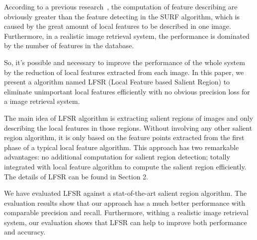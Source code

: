 According to a previous research~\cite{Fang2011ispass}, the computation of feature describing are obviously greater than the feature detecting in the SURF algorithm, which is caused by the great amount of local features to be described in one image. Furthermore, in a realistic image retrieval system, the performance is dominated by the number of features in the database.

So, it's possible and necessary to improve the performance of the whole system by the reduction of local features extracted from each image. In this paper, we present a algorithm named LFSR (Local Feature based Salient Region) to eliminate unimportant local features efficiently with no obvious precision loss for a image retrieval system.

The main idea of LFSR algorithm is extracting salient regions of images and only describing the local features in those regions. Without involving any other salient region algorithm, it is only based on the feature points extracted from the first phase of a typical local feature algorithm. This approach has two remarkable advantages: no additional computation for salient region detection; totally integrated with local feature algorithm to compute the salient region efficiently. The details of LFSR can be found in Section 2. 

We have evaluated LFSR against a stat-of-the-art salient region algorithm. The evaluation results show that our approach has a much better performance with comparable precision and recall. Furthermore, withing a realistic image retrieval system, our evaluation shows that LFSR can help to improve both performance and accuracy.